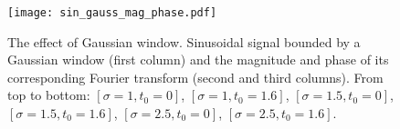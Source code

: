 \begin{figure}
\centering
\texttt{[image: sin\_gauss\_mag\_phase.pdf]}
\caption{The effect of Gaussian window. Sinusoidal signal bounded by a Gaussian window (first column) and the magnitude and phase of its corresponding Fourier transform (second and third columns). From top to bottom: $[\sigma=1, t_0=0]$, $[\sigma=1, t_0=1.6]$, $[\sigma=1.5, t_0=0]$, $[\sigma=1.5, t_0=1.6]$, $[\sigma=2.5, t_0=0]$, $[\sigma=2.5, t_0=1.6]$.}\label{fig:gaussian_window_mag_phase}
\end{figure}






